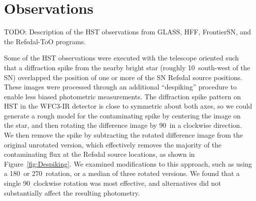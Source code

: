 \section{Observations}\label{sec:Observations}

TODO: Description of the HST observations from GLASS, HFF, FrontierSN, and the Refsdal-ToO programs. 


Some of the HST observations were executed with the telescope oriented such that a diffraction spike from the nearby bright star (roughly 10\arcsec\ south-west of the SN) overlapped the position of one or more of the SN Refsdal source positions.  These images were processed through an additional ``despiking'' procedure to enable less biased photometric measurements.  The diffraction spike pattern on HST in the WFC3-IR detector is close to symmetric about both axes, so we could generate a rough model for the contaminating spike by centering the image on the star, and then rotating the difference image by 90\deg\ in a clockwise direction.  We then remove the spike by subtracting the rotated difference image from the original unrotated version, which effectively removes the majority of the contaminating flux at the Refsdal source locations, as shown in Figure~\ref{fig:Despiking}.  We examined modifications to this approach, such as using a 180\deg\ or 270\deg\ rotation, or a median of three rotated versions.  We found that a single 90\deg\ clockwise rotation was most effective, and alternatives did not substantially affect the resulting photometry.





